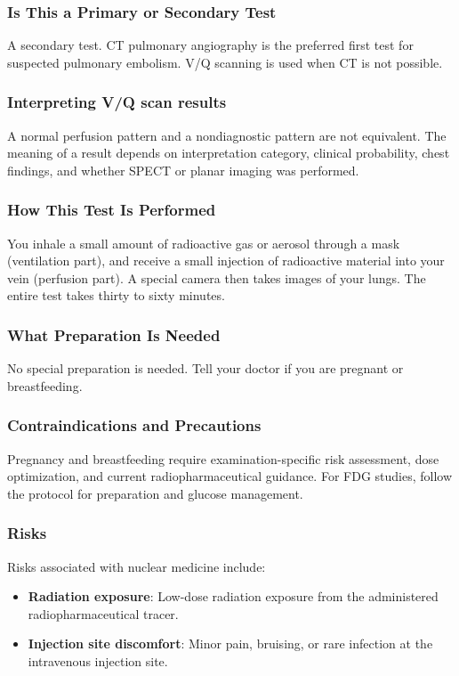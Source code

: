 \subsubsection*{Is This a Primary or Secondary Test}
A secondary test. CT pulmonary angiography is the preferred first test for suspected pulmonary embolism. V/Q scanning is used when CT is not possible.

\subsubsection*{Interpreting V/Q scan results}
A normal perfusion pattern and a nondiagnostic pattern are not equivalent. The meaning of a result depends on interpretation category, clinical probability, chest findings, and whether SPECT or planar imaging was performed.

\subsubsection*{How This Test Is Performed}
You inhale a small amount of radioactive gas or aerosol through a mask (ventilation part), and receive a small injection of radioactive material into your vein (perfusion part). A special camera then takes images of your lungs. The entire test takes thirty to sixty minutes.

\subsubsection*{What Preparation Is Needed}
No special preparation is needed. Tell your doctor if you are pregnant or breastfeeding.

\subsubsection*{Contraindications and Precautions}
Pregnancy and breastfeeding require examination-specific risk assessment, dose optimization, and current radiopharmaceutical guidance. For FDG studies, follow the protocol for preparation and glucose management.

\subsubsection*{Risks}
Risks associated with nuclear medicine include:
\begin{itemize}
    \item \textbf{Radiation exposure}: Low-dose radiation exposure from the administered radiopharmaceutical tracer.
    \item \textbf{Injection site discomfort}: Minor pain, bruising, or rare infection at the intravenous injection site.
\end{itemize}



